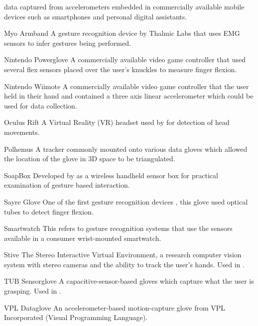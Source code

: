 \begin{Nomencl}[1cm]
        data captured from accelerometers embedded in commercially available
        mobile devices such as smartphones and personal digital assistants.
    \item[Myo Armband] A gesture recognition device by Thalmic Labs that uses
        EMG sensors to infer gestures being performed.
    \item[Nintendo Powerglove] A commercially available video game controller
        that used several flex sensors placed over the user's knuckles to
        measure finger flexion.
    \item[Nintendo Wiimote] A commercially available video game controller that
        the user held in their hand and contained a three axis linear
        accelerometer which could be used for data collection.
    \item[Oculus Rift] A Virtual Reality (VR) headset used by
        \cite{zhaoRealtimeHeadGesture2017} for detection of head movements.
    \item[Polhemus] A tracker commonly mounted onto various data gloves which
        allowed the location of the glove in 3D space to be triangulated.
    \item[SoapBox] Developed by \cite{mantyjarviEnablingFastEffortless2004} as
        a wireless handheld sensor box for practical examination of gesture
        based interaction.
    \item[Sayre Glove] One of the first gesture recognition
        devices \citep{thomasa.defantiUSNEAR60341631977}, this glove used
        optical tubes to detect finger flexion.
    \item[Smartwatch] This refers to gesture recognition systems that use the
        sensors available in a consumer wrist-mounted smartwatch.
    \item[Stive] The Stereo Interactive Virtual Environment, a research
        computer vision system with stereo cameras and the ability to track the
        user's hands. Used in \cite{wilsonParametricHiddenMarkov1999}.
    \item[TUB Sensorglove] A capacitive-sensor-based gloves which capture what
        the user is grasping. Used in \cite{hofmannVelocityProfileBased1998}.
    \item[VPL Dataglove]  An accelerometer-based motion-capture glove from VPL Incorporated (Visual Programming Language).
\end{Nomencl}


